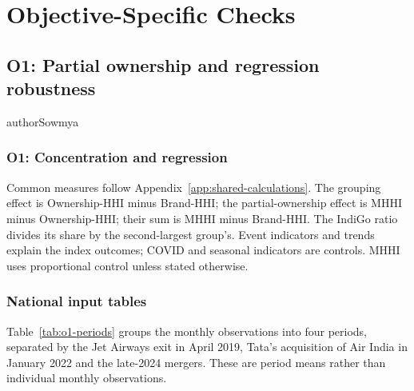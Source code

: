 \section{Objective-Specific Checks}
\label{app:results-details}
\subsection{O1: Partial ownership and regression robustness}
\label{app:results-o1}
\begin{mergedcontribution}{authorSowmya}
\subsubsection{O1: Concentration and regression}
\label{app:o1-definitions}
\label{app:o1-dictionary}
Common measures follow Appendix~\ref{app:shared-calculations}. The grouping effect is Ownership-HHI minus Brand-HHI; the partial-ownership effect is MHHI minus Ownership-HHI; their sum is MHHI minus Brand-HHI. The IndiGo ratio divides its share by the second-largest group's. Event indicators and trends explain the index outcomes; COVID and seasonal indicators are controls. MHHI uses proportional control unless stated otherwise.

\subsubsection{National input tables}
\label{app:eda-national-inputs}
Table~\ref{tab:o1-periods} groups the monthly observations into four periods, separated by the Jet Airways exit in April 2019, Tata's acquisition of Air India in January 2022 and the late-2024 mergers. These are period means rather than individual monthly observations.


\end{mergedcontribution}
